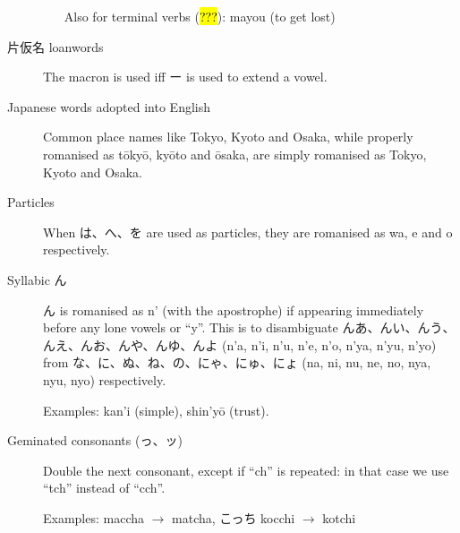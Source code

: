 \documentclass[../nihongo-gakushuu-kyouzai.tex]{subfiles}
\begin{document}
\begin{description}
\begin{itemize}
        Also for terminal verbs (\hl{???}):  mayou (to get lost)
    \end{itemize}
    \item[片仮名 loanwords] The macron is used iff ー is used to extend a vowel.
    \item[Japanese words adopted into English] Common place names like Tokyo, Kyoto and Osaka, while properly romanised as t\=oky\=o, ky\=oto and \=osaka, are simply romanised as Tokyo, Kyoto and Osaka.
    \item[Particles] When は、へ、を are used as particles, they are romanised as wa, e and o respectively.
    \item[Syllabic ん] ん is romanised as n' (with the apostrophe) if appearing immediately before any lone vowels or ``y''. This is to disambiguate んあ、んい、んう、んえ、んお、んや、んゆ、んよ (n'a, n'i, n'u, n'e, n'o, n'ya, n'yu, n'yo) from な、に、ぬ、ね、の、にゃ、にゅ、にょ (na, ni, nu, ne, no, nya, nyu, nyo) respectively.

    Examples:  kan'i (simple),  shin'y\=o (trust).
    \item[Geminated consonants (っ、ッ)] Double the next consonant, except if ``ch'' is repeated: in that case we use ``tch'' instead of ``cch''.

    Examples:  maccha $\to$ matcha, こっち kocchi $\to$ kotchi
\end{description}
\end{document}
